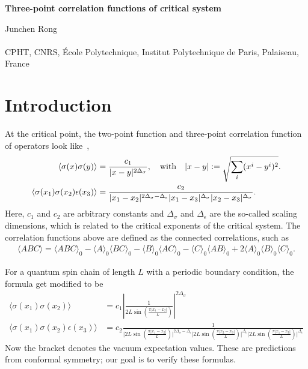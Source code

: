 \documentclass[prb,twocolumn,11pt]{revtex4-1}
\begin{document}
\def\thesection{\arabic{section}}
\def\thesubsection{\arabic{section}.\arabic{subsection}}

\onecolumngrid
\begin{center}
{\Large {\bf Three-point correlation functions of critical system}}
\vspace{10pt}

{\Large
\bigskip
Junchen Rong
}
{\\~
\\CPHT, CNRS, \'Ecole Polytechnique, Institut Polytechnique de Paris, Palaiseau, France}
\end{center}
\section{Introduction}
At the critical point, the two-point function and three-point correlation function of operators look like~\cite{polyakov1969microscopic},
\begin{align}
\langle\sigma(x)\sigma(y)\rangle &= \frac{c_1}{|x-y|^{2\Delta_{\sigma}}}, \quad {\rm with} \quad |x-y|:=\sqrt{\sum_i (x^i-y^i)^2}.\nonumber\\
\langle\sigma(x_1)\sigma(x_2)\epsilon(x_3)\rangle &=\frac{c_2}{|x_1-x_2|^{2\Delta_{\sigma}-\Delta_{\epsilon}}|x_1-x_3|^{\Delta_{\sigma}}|x_2-x_3|^{\Delta_{\sigma}}}.
\end{align}
Here, $c_1$ and $c_2$ are arbitrary constants and $\Delta_{\sigma}$ and $\Delta_{\epsilon}$ are the so-called scaling dimensions, which is related to the critical exponents of the critical system.
The correlation functions above are defined as the connected correlations, such as
\begin{align}
    \langle ABC\rangle= \langle ABC\rangle_0-\langle A\rangle_0\langle BC\rangle_0-\langle B\rangle_0\langle AC\rangle_0-\langle C\rangle_0\langle AB\rangle_0+2 \langle A\rangle_0\langle B\rangle_0 \langle C\rangle_0.
\end{align}

For a quantum spin chain of length $L$ with a periodic boundary condition, the formula get modified to be 
\begin{align}
    \langle\sigma(x_1)\sigma(x_2)\rangle& = c_1\left|\frac{1}{2L\sin(\frac{\pi|x_1-x_2|}{L})}\right|^{2\Delta_{\sigma}}\nonumber\\
\langle\sigma(x_1)\sigma(x_2)\epsilon(x_3)\rangle&=c_2 \frac{1}{\bigg|2L\sin(\frac{\pi|x_1-x_2|}{L})\bigg|^{2\Delta_\sigma-\Delta_\epsilon}\bigg|2L\sin(\frac{\pi|x_2-x_3|}{L})\bigg|^{\Delta_\epsilon}\bigg|2L\sin(\frac{\pi|x_1-x_3|}{L})\bigg|^{\Delta_\epsilon}}
\end{align}
Now the bracket denotes the vacuum expectation values. These are predictions from conformal symmetry; our goal is to verify these formulas. 
\end{document}
